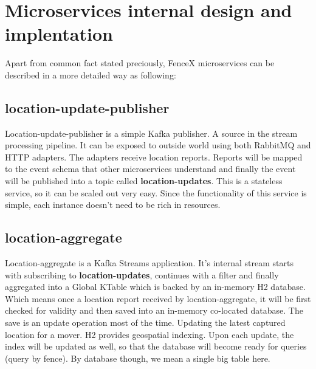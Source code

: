 \documentclass[a4]{report}
\begin{document}
        \section{Microservices internal design and implentation}
        Apart from common fact stated preciously, FenceX microservices can be described in a more detailed way as following:

        \subsection{location-update-publisher}
        Location-update-publisher is a simple Kafka publisher.
        A source in the stream processing pipeline.
        It can be exposed to outside world using both RabbitMQ and HTTP adapters.
        The adapters receive location reports.
        Reports will be mapped to the event schema that other microservices
        understand and finally the event will be published into a topic called \textbf{location-updates}.
        This is a stateless service, so it can be scaled out very easy.
        Since the functionality of this service is simple, each instance doesn't need to be rich in resources.

        \subsection{location-aggregate}
        Location-aggregate is a Kafka Streams application.
        It's internal stream starts with subscribing to \textbf{location-updates}, continues with a filter and finally
        aggregated into a Global KTable which is backed by an in-memory H2 database.
        Which means once a location report received by location-aggregate, it will be first checked for validity and then
        saved into an in-memory co-located database.
        The save is an update operation most of the time.
        Updating the latest captured location for a mover.
        H2 provides geospatial indexing.
        Upon each update, the index will be updated as well, so that the database will become ready for queries (query by
        fence).
        By database though, we mean a single big table here.
\end{document}

